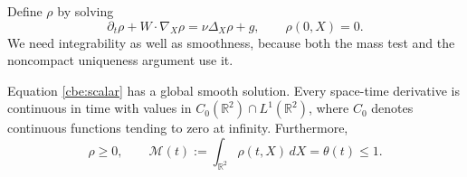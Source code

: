 Define $\rho$ by solving
\begin{equation}\label{cbe:scalar}
 \partial_t\rho+W\cdot\nabla_X\rho
       =\nu\Delta_X\rho+g,\qquad \rho(0,X)=0.
\end{equation}
We need integrability as well as smoothness, because both the mass
test and the noncompact uniqueness argument use it.

\begin{lemma}
\label{cbe:scalar-lemma}
Equation \eqref{cbe:scalar} has a global smooth solution.  Every
space-time derivative is continuous in time with values in
$C_0(\mathbb R^2)\cap L^1(\mathbb R^2)$, where $C_0$ denotes
continuous functions tending to zero at infinity.  Furthermore,
\begin{equation}\label{cbe:mass}
 \rho\ge0,\qquad
 \mathcal M(t):=\int_{\mathbb R^2}\rho(t,X)\,dX=\theta(t)\le1.
\end{equation}
\end{lemma}

